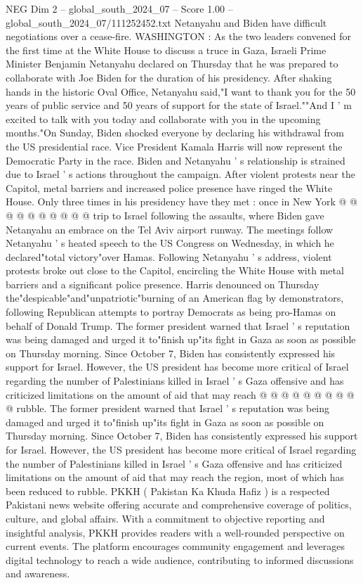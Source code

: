 \begin{textsample}{NEG Dim 2 – global\_south\_2024\_07 – Score 1.00 – global\_south\_2024\_07/111252452.txt}  \label{ex:f2_neg_284}
Netanyahu and Biden have difficult negotiations over a cease-fire.
WASHINGTON : As the two leaders convened for the first time at the White House to discuss a truce in Gaza, Israeli Prime Minister Benjamin Netanyahu declared on Thursday that he was prepared to collaborate with Joe Biden for the duration of his presidency.
After shaking hands in the historic Oval Office, Netanyahu said,"I want to thank you for the 50 years of public service and 50 years of support for the state of Israel.""And I ' m excited to talk with you today and collaborate with you in the upcoming months."On Sunday, Biden shocked everyone by declaring his withdrawal from the US presidential race.
Vice President Kamala Harris will now represent the Democratic Party in the race.
Biden and Netanyahu ' s relationship is strained due to Israel ' s actions throughout the campaign.
After violent protests near the Capitol, metal barriers and increased police presence have ringed the White House.
Only three times in his presidency have they met : once in New York @ @ @ @ @ @ @ @ @ @ trip to Israel following the assaults, where Biden gave Netanyahu an embrace on the Tel Aviv airport runway.
The meetings follow Netanyahu ' s heated speech to the US Congress on Wednesday, in which he declared"total victory"over Hamas.
Following Netanyahu ' s address, violent protests broke out close to the Capitol, encircling the White House with metal barriers and a significant police presence.
Harris denounced on Thursday the"despicable"and"unpatriotic"burning of an American flag by demonstrators, following Republican attempts to portray Democrats as being pro-Hamas on behalf of Donald Trump.
The former president warned that Israel ' s reputation was being damaged and urged it to"finish up"its fight in Gaza as soon as possible on Thursday morning.
Since October 7, Biden has consistently expressed his support for Israel.
However, the US president has become more critical of Israel regarding the number of Palestinians killed in Israel ' s Gaza offensive and has criticized limitations on the amount of aid that may reach @ @ @ @ @ @ @ @ @ @ rubble.
The former president warned that Israel ' s reputation was being damaged and urged it to"finish up"its fight in Gaza as soon as possible on Thursday morning.
Since October 7, Biden has consistently expressed his support for Israel.
However, the US president has become more critical of Israel regarding the number of Palestinians killed in Israel ' s Gaza offensive and has criticized limitations on the amount of aid that may reach the region, most of which has been reduced to rubble.
PKKH ( Pakistan Ka Khuda Hafiz ) is a respected Pakistani news website offering accurate and comprehensive coverage of politics, culture, and global affairs.
With a commitment to objective reporting and insightful analysis, PKKH provides readers with a well-rounded perspective on current events.
The platform encourages community engagement and leverages digital technology to reach a wide audience, contributing to informed discussions and awareness.

\end{textsample}
